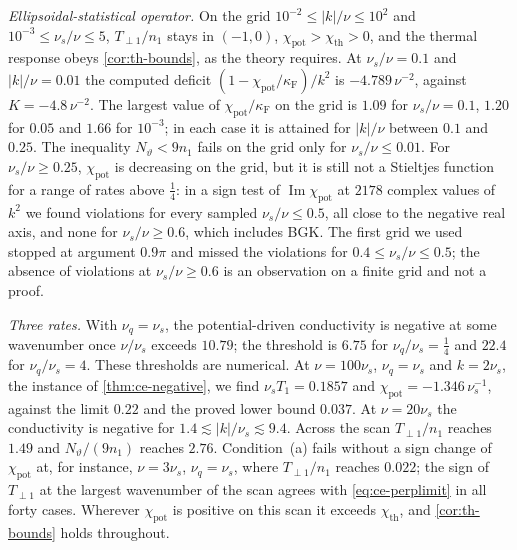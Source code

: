 \documentclass[11pt]{article}
\newcommand{\F}{\kappa_{\mathrm F}}
\newcommand{\Imag}{\operatorname{Im}}
\newcommand{\thr}{\mathrm{th}}
\newcommand{\pot}{\mathrm{pot}}
\theoremstyle{definition}
\theoremstyle{remark}
\numberwithin{equation}{section}
\begin{document}
\emph{Ellipsoidal-statistical operator.} On the grid
$10^{-2}\leq|k|/\nu\leq10^2$ and $10^{-3}\leq\nu_s/\nu\leq5$,
$T_{\perp1}/n_1$ stays in $(-1,0)$, $\chi_\pot>\chi_\thr>0$, and the
thermal response obeys \cref{cor:th-bounds}, as the theory requires. At
$\nu_s/\nu=0.1$ and $|k|/\nu=0.01$ the computed deficit
$(1-\chi_\pot/\F)/k^2$ is $-4.789\,\nu^{-2}$, against $K=-4.8\,\nu^{-2}$.
The largest value of $\chi_\pot/\F$ on the grid is $1.09$ for
$\nu_s/\nu=0.1$, $1.20$ for $0.05$ and $1.66$ for $10^{-3}$; in each case
it is attained for $|k|/\nu$ between $0.1$ and $0.25$. The inequality
$N_\vartheta<9n_1$ fails on the grid only for $\nu_s/\nu\leq0.01$. For
$\nu_s/\nu\geq0.25$, $\chi_\pot$ is decreasing on the grid, but it is
still not a Stieltjes function for a range of rates above $\tfrac14$: in
a sign test of $\Imag\chi_\pot$ at $2178$ complex values of $k^2$ we
found violations for every sampled $\nu_s/\nu\leq0.5$, all close to the
negative real axis, and none for $\nu_s/\nu\geq0.6$, which includes BGK.
The first grid we used stopped at argument $0.9\pi$ and missed the
violations for $0.4\leq\nu_s/\nu\leq0.5$; the absence of violations at
$\nu_s/\nu\geq0.6$ is an observation on a finite grid and not a proof.

\emph{Three rates.} With $\nu_q=\nu_s$, the potential-driven conductivity
is negative at some wavenumber once $\nu/\nu_s$ exceeds $10.79$; the
threshold is $6.75$ for $\nu_q/\nu_s=\tfrac14$ and $22.4$ for
$\nu_q/\nu_s=4$. These thresholds are numerical. At
$\nu=100\nu_s$, $\nu_q=\nu_s$ and $k=2\nu_s$, the instance of
\cref{thm:ce-negative}, we find $\nu_sT_1=0.1857$ and
$\chi_\pot=-1.346\,\nu_s^{-1}$, against the limit $0.22$ and the proved
lower bound $0.037$. At $\nu=20\nu_s$ the conductivity is negative for
$1.4\lesssim|k|/\nu_s\lesssim9.4$. Across the scan $T_{\perp1}/n_1$
reaches $1.49$ and $N_\vartheta/(9n_1)$ reaches $2.76$. Condition~(a)
fails without a sign change of $\chi_\pot$ at, for instance,
$\nu=3\nu_s$, $\nu_q=\nu_s$, where $T_{\perp1}/n_1$ reaches $0.022$; the
sign of $T_{\perp1}$ at the largest wavenumber of the scan agrees with
\eqref{eq:ce-perplimit} in all forty cases. Wherever $\chi_\pot$ is
positive on this scan it exceeds $\chi_\thr$, and \cref{cor:th-bounds}
holds throughout.
\end{document}
